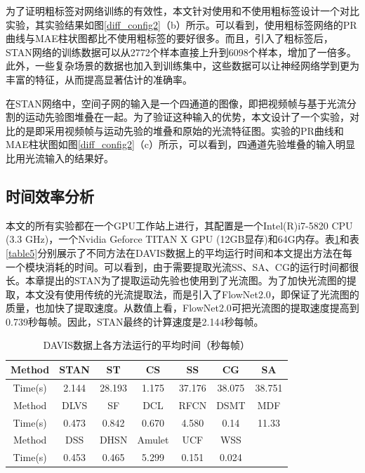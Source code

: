 为了证明粗标签对网络训练的有效性，本文针对使用和不使用粗标签设计一个对比实验，其实验结果如图\ref{diff_config2}（b）所示。可以看到，使用粗标签网络的PR曲线与MAE柱状图都比不使用粗标签的要好很多。而且，引入了粗标签后，STAN网络的训练数据可以从2772个样本直接上升到6098个样本，增加了一倍多。此外，一些复杂场景的数据也加入到训练集中，这些数据可以让神经网络学到更为丰富的特征，从而提高显著估计的准确率。

在STAN网络中，空间子网的输入是一个四通道的图像，即把视频帧与基于光流分割的运动先验图堆叠在一起。为了验证这种输入的优势，本文设计了一个实验，对比的是即采用视频帧与运动先验的堆叠和原始的光流特征图。实验的PR曲线和MAE柱状图如图\ref{diff_config2}（c）所示，可以看到，四通道先验堆叠的输入明显比用光流输入的结果好。

\subsection{时间效率分析}

本文的所有实验都在一个GPU工作站上进行，其配置是一个Intel(R)i7-5820 CPU (3.3 GHz)，一个Nvidia Geforce TITAN X GPU (12GB显存)和64G内存。表\ref{table4}和表\ref{table5}分别展示了不同方法在DAVIS数据上的平均运行时间和本文提出方法在每一个模块消耗的时间。可以看到，由于需要提取光流SS、SA、CG的运行时间都很长。本章提出的STAN为了提取运动先验也使用到了光流图。为了加快光流图的提取，本文没有使用传统的光流提取法\cite{Sun2014A}，而是引入了FlowNet2.0\cite{8099662}，即保证了光流图的质量，也加快了提取速度。从数值上看，FlowNet2.0可把光流图的提取速度提高到0.739秒每帧。因此，STAN最终的计算速度是2.144秒每帧。

\begin{table}
\centering
\caption{DAVIS数据上各方法运行的平均时间（秒每帧）}
\renewcommand{\arraystretch}{1.0}
\begin{tabular}{|c|c|c|c|c|c|c|}
\hline
\hline
Method &STAN  &ST  &CS  &SS    &CG  &SA\\
\hline
Time(s) &2.144  &28.193 &1.175   &37.176  &38.075 &38.751\\
\hline
\hline
Method    &DLVS  &SF   &DCL    &RFCN   &DSMT   &MDF  \\
\hline
Time(s)    &0.473 &0.842 &0.670   &4.580  &0.14    &11.33    \\
\hline
\hline
Method      &DSS  &DHSN   &Amulet   &UCF  &WSS  & \\
\hline
Time(s)    &0.453  &0.465   &5.299   &0.151 &0.024 & \\
\hline
\end{tabular}
\label{table4}
\end{table}


